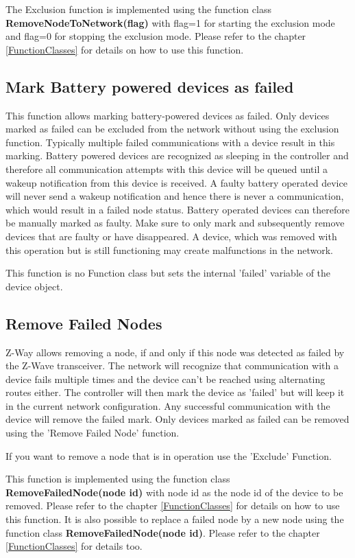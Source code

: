 The Exclusion function is implemented using the function class 
{\bf RemoveNodeToNetwork(flag)} with flag=1 for starting the exclusion mode and flag=0 
for stopping the 
exclusion mode. Please refer to the chapter \ref{FunctionClasses} for details on how to use this function.

\subsection{Mark Battery powered devices as failed}

This function allows marking battery-powered devices as failed. Only devices marked as 
failed can be excluded from the network without using the exclusion 
function. Typically multiple failed communications with a device result in this marking. 
Battery powered devices are recognized as sleeping in the controller 
and therefore all communication attempts with this device will be queued until a wakeup 
notification from this device is received. A faulty battery operated 
device will never send a wakeup notification and hence there is never a communication, 
which would result in a failed node status. Battery operated devices 
can therefore be manually marked as faulty.  Make sure to only mark  and subsequently 
remove  devices that are faulty or have disappeared. A device, which 
was removed with this operation but is still functioning may create malfunctions in the network.

This function is no Function class but sets the internal 'failed' variable of the device
object.

\subsection{Remove Failed Nodes}

Z-Way allows removing a node, if and only if this node was detected as failed by the 
Z-Wave transceiver. The network will recognize that communication with a device fails 
multiple times and the device can’t be reached using alternating routes either. 
The controller will then mark the device as 'failed' but will keep it in the current 
network configuration.  Any successful communication with the device will remove the 
failed mark. Only devices marked as failed can be removed using the 'Remove Failed Node' 
function.

If you want to remove a node that is in operation use the 'Exclude' Function.


This function is implemented using the function class {\bf RemoveFailedNode(node id)} 
with node id as the node id of the device to be removed. Please refer to the chapter 
\ref{FunctionClasses} for details on how to use this function. It is also possible to 
replace a failed node by a new node using the function class {\bf RemoveFailedNode(node id)}. 
Please refer to the  chapter \ref{FunctionClasses} for details too.

